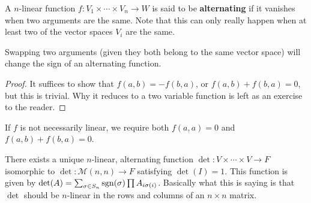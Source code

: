 \begin{df}
A $n$-linear function $f : V_1 \times \cdots \times V_n \rightarrow W$
is said to be \textbf{alternating} if it vanishes when two arguments are
the same.  Note that this can only really happen when at least two of
the vector spaces $V_i$ are the same.
\end{df}

\begin{prop}
Swapping two arguments (given they both belong to the same vector space)
will change the sign of an alternating function.
\end{prop}

\begin{proof}
It suffices to show that $f(a, b) = -f(b, a)$, or $f(a, b) + f(b, a) =
0$, but this is trivial. Why it reduces to a two variable function is
left as an exercise to the reader.
\end{proof}

\begin{rem}
If $f$ is not necessarily linear, we require both $f(a, a) = 0$ and
$f(a, b) + f(b, a) = 0$.
\end{rem}

\begin{thm}
There exists a unique $n$-linear, alternating function $\det : V \times
\cdots \times V \rightarrow F$ isomorphic to $\det : \mathcal{M}(n, n)
\rightarrow F$ satisfying $\det(I) = 1$. This function is given by
$\det(A) = \sum_{\sigma \in S_n} \operatorname{sgn}(\sigma) \prod A_{i \sigma(i)}$.
Basically what this is saying is that $\det$ should be $n$-linear in the
rows and columns of an $n \times n$ matrix.
\end{thm}

